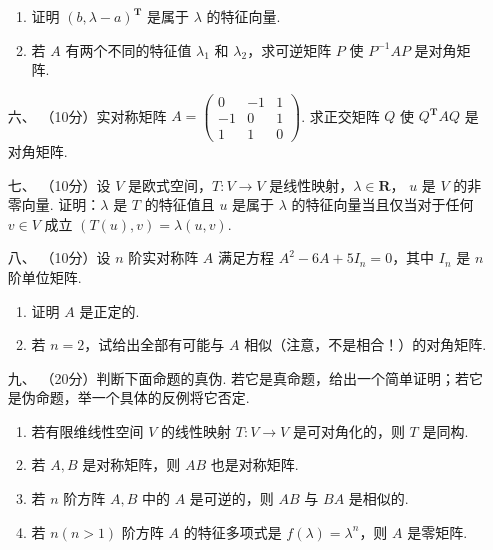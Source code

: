 \begin{enumerate}
\begin{enumerate}[label=(\arabic*)]
    \item 证明 $(b,\lambda-a)^\mathbf{T}$ 是属于 $\lambda$ 的特征向量.

    \item 若 $A$ 有两个不同的特征值 $\lambda_1$ 和 $\lambda_2$，求可逆矩阵 $P$ 使 $P^{-1}AP$ 是对角矩阵.
\end{enumerate}

\item [六、]（10分）实对称矩阵 $A=\begin{pmatrix}0 & -1 & 1 \\ -1 & 0 & 1 \\ 1 & 1 & 0\end{pmatrix}$.  求正交矩阵 $Q$ 使 $Q^\mathbf{T}AQ$ 是对角矩阵.

    \item [七、]（10分）设 $V$ 是欧式空间，$T:V\to V$ 是线性映射，$\lambda \in \mathbf{R}$， $u$ 是 $V$ 的非零向量. 证明：$\lambda$ 是 $T$ 的特征值且 $u$ 是属于 $\lambda$ 的特征向量当且仅当对于任何 $v\in V$ 成立 $(T(u),v) = \lambda(u,v)$.

    \item [八、]（10分）设 $n$ 阶实对称阵 $A$ 满足方程 $A^2-6A+5I_n=0$，其中 $I_n$ 是 $n$ 阶单位矩阵.
    \begin{enumerate}[label=(\arabic*)]
        \item 证明 $A$ 是正定的.

        \item 若 $n=2$，试给出全部有可能与 $A$ 相似（注意，不是相合！）的对角矩阵.
    \end{enumerate}

\item [九、]（20分）判断下面命题的真伪. 若它是真命题，给出一个简单证明；若它是伪命题，举一个具体的反例将它否定.
    \begin{enumerate}[label=(\arabic*)]
        \item 若有限维线性空间 $V$ 的线性映射 $T:V \to V$ 是可对角化的，则 $T$ 是同构.

        \item 若 $A,B$ 是对称矩阵，则 $AB$ 也是对称矩阵.

        \item 若 $n$ 阶方阵 $A,B$ 中的 $A$ 是可逆的，则 $AB$ 与 $BA$ 是相似的.

        \item 若 $n(n>1)$ 阶方阵 $A$ 的特征多项式是 $f(\lambda)=\lambda^n$，则 $A$ 是零矩阵.
    \end{enumerate}
\end{enumerate}

\clearpage
